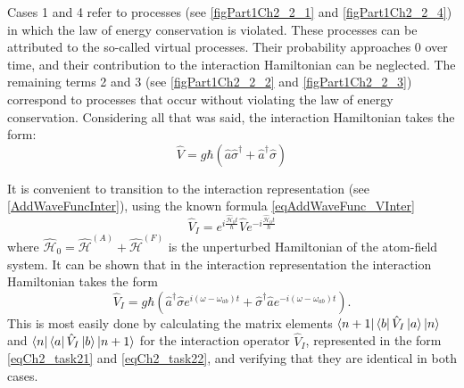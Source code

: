 Cases 1 and 4 refer to processes (see \autoref{figPart1Ch2_2_1} and
\ref{figPart1Ch2_2_4}) in which the law of energy conservation is violated.
These processes can be attributed to the so-called virtual processes. Their
probability approaches 0 over time, and their contribution to the interaction Hamiltonian can be
neglected. The remaining terms 2 and 3 (see \autoref{figPart1Ch2_2_2} and
\ref{figPart1Ch2_2_3}) correspond to processes
that occur without violating the law of energy conservation. Considering all
that was said, the interaction Hamiltonian takes the form: 
\begin{equation}
\hat{V} = g \hbar \left(
\hat{a}\hat{\sigma}^{\dag} + 
\hat{a}^{\dag}\hat{\sigma}
\right)
\end{equation}

It is convenient to transition to the interaction representation (see \autoref{AddWaveFuncInter}),
using the known 
formula \eqref{eqAddWaveFunc_VInter}
\begin{equation}
\hat{V}_I = 
e^{i \frac{\hat{\mathcal{H}}_0 t}{\hbar}}
\hat{V}
e^{- i \frac{\hat{\mathcal{H}}_0 t}{\hbar}}
\label{eqCh2_task21}
\end{equation}
where 
\(
\hat{\mathcal{H}}_0 = 
\hat{\mathcal{H}}^{\left(A\right)} +
\hat{\mathcal{H}}^{\left(F\right)}
\)
is the unperturbed Hamiltonian of the atom-field system. It can be shown that in
the interaction representation the interaction Hamiltonian takes the form 
\begin{equation}
\hat{V}_I = 
g \hbar \left(
\hat{a}^{\dag}\hat{\sigma} e^{i \left(\omega - \omega_{ab}\right)t} +
\hat{\sigma}^{\dag} \hat{a} e^{-i \left(\omega - \omega_{ab}\right)t}
\right).
\label{eqCh2_task22}
\end{equation}
This is most easily done by calculating the matrix elements 
$\left<n +
1\right|\bra{b}\hat{V}_I\ket{a}\ket{n}$ and
$\bra{n}\bra{a}\hat{V}_I\ket{b}\left|n +
1\right>$ for the interaction operator $\hat{V}_I$, represented in
the form \eqref{eqCh2_task21} and \eqref{eqCh2_task22}, and verifying that they
are identical in both cases.